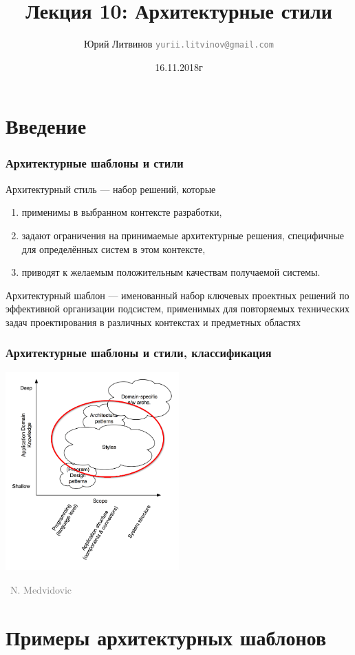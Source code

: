 \documentclass[xetex,mathserif,serif]{beamer}
\title{Лекция 10: Архитектурные стили}
\author[Юрий Литвинов]{Юрий Литвинов \newline \textcolor{gray}{\small\texttt{yurii.litvinov@gmail.com}}}
\date{16.11.2018г}
\newcommand{\attribution}[1] {
	\vspace{-5mm}\begin{flushright}\begin{scriptsize}\textcolor{gray}{\textcopyright\, #1}\end{scriptsize}\end{flushright}
}
\begin{document}
	
	\frame{\titlepage}

	\section{Введение}

	\begin{frame}
		\frametitle{Архитектурные шаблоны и стили}
		Архитектурный стиль --- набор решений, которые
		\begin{enumerate}
			\item применимы в выбранном контексте разработки,
			\item задают ограничения на принимаемые архитектурные решения, специфичные для определённых систем в этом контексте,
			\item приводят к желаемым положительным качествам получаемой системы.
		\end{enumerate}
		Архитектурный шаблон --- именованный набор ключевых проектных решений по эффективной организации подсистем, применимых для повторяемых технических задач проектирования в различных контекстах и предметных областях
	\end{frame}

	\begin{frame}
		\frametitle{Архитектурные шаблоны и стили, классификация}
		\begin{center}
			\includegraphics[width=0.5\textwidth]{architecturalStylesHighlighted.png}
			\attribution{N. Medvidovic}
		\end{center}
	\end{frame}

	\section{Примеры архитектурных шаблонов}
\end{document}
